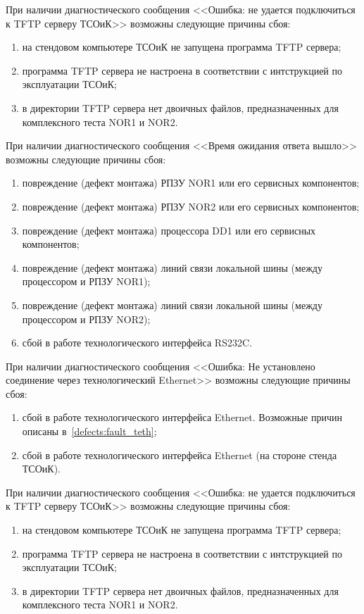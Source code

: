     \subpoint При наличии диагностического сообщения <<Ошибка: не удается подключиться к TFTP серверу ТСОиК>> возможны следующие причины сбоя:
      \begin{enumerate}  
	\item на стендовом компьютере ТСОиК не запущена программа TFTP сервера;
	\item программа TFTP сервера не настроена в соответствии с интструкцией по эксплуатации ТСОиК;
	\item в директории TFTP сервера нет двоичных файлов, предназначенных для комплексного теста NOR1 и NOR2.
      \end{enumerate}
      
    \subpoint При наличии диагностического сообщения <<Время ожидания ответа вышло>> возможны следующие причины сбоя:
      \begin{enumerate} 
	\item повреждение (дефект монтажа) РПЗУ NOR1 или его сервисных компонентов;
	\item повреждение (дефект монтажа) РПЗУ NOR2 или его сервисных компонентов;
	\item повреждение (дефект монтажа) процессора DD1 или его сервисных компонентов;
	\item повреждение (дефект монтажа) линий связи локальной шины (между процессором и РПЗУ NOR1);
	\item повреждение (дефект монтажа) линий связи локальной шины (между процессором и РПЗУ NOR2);
	\item сбой в работе технологического интерфейса RS232C.	  
      \end{enumerate}    
      
    \subpoint При наличии диагностического сообщения  <<Ошибка: Не установлено соединение через технологический Ether\-net>>  возможны следующие причины сбоя:
      \begin{enumerate}  
	  \item сбой в работе технологического интерфейса Ether\-net. Возможные причин описаны в~\ref{defects:fault_teth};
	  \item сбой в работе технологического интерфейса Ether\-net (на стороне стенда ТСОиК).
      \end{enumerate}
    
    \subpoint При наличии диагностического сообщения  <<Ошибка: не удается подключиться к TFTP серверу ТСОиК>> возможны следующие причины сбоя:
      \begin{enumerate}  
	\item на стендовом компьютере ТСОиК не запущена программа TFTP сервера;
	\item программа TFTP сервера не настроена в соответствии с интструкцией по эксплуатации ТСОиК;
	\item в директории TFTP сервера нет двоичных файлов, предназначенных для комплексного теста NOR1 и NOR2.
      \end{enumerate}
    
